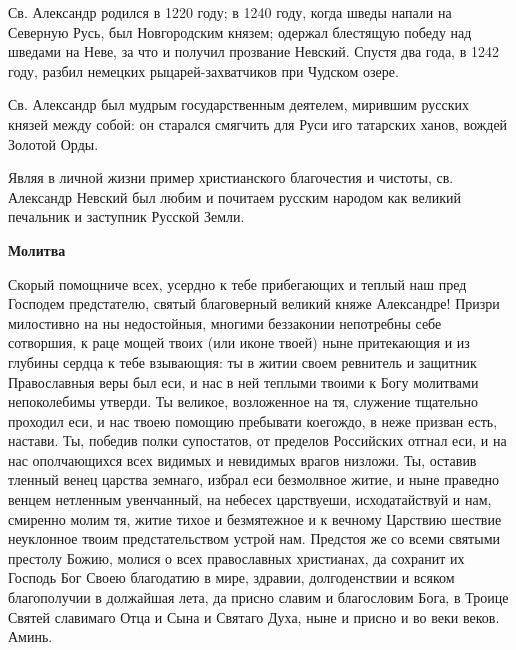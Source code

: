 \bigskip\bigskip\mychapterending

 

Св. Александр родился в 1220 году; в 1240 году, когда шведы напали на Северную Русь, был Новгородским князем; одержал блестящую победу над шведами на Неве, за что и получил прозвание Невский. Спустя два года, в 1242 году, разбил немецких рыцарей-захватчиков при Чудском озере. 

Св. Александр был мудрым государственным деятелем, мирившим русских князей между собой: он старался смягчить для Руси иго татарских ханов, вождей Золотой Орды. 

Являя в личной жизни пример христианского благочестия и чистоты, св. Александр Невский был любим и почитаем русским народом как великий печальник и заступник Русской Земли.


\medskip
\bfseries Молитва\normalfont{}

Скорый помощниче всех, усердно к тебе прибегающих и теплый наш пред Господем предстателю, святый благоверный великий княже Александре! Призри милостивно на ны недостойныя, многими беззаконии непотребны себе сотворшия, к раце мощей твоих (или иконе твоей) ныне притекающия и из глубины сердца к тебе взывающия: ты в житии своем ревнитель и защитник Православныя веры был еси, и нас в ней теплыми твоими к Богу молитвами непоколебимы утверди. Ты великое, возложенное на тя, служение тщательно проходил еси, и нас твоею помощию пребывати коегождо, в неже призван есть, настави. Ты, победив полки супостатов, от пределов Российских отгнал еси, и на нас ополчающихся всех видимых и невидимых врагов низложи. Ты, оставив тленный венец царства земнаго, избрал еси безмолвное житие, и ныне праведно венцем нетленным увенчанный, на небесех царствуеши, исходатайствуй и нам, смиренно молим тя, житие тихое и безмятежное и к вечному Царствию шествие неуклонное твоим предстательством устрой нам. Предстоя же со всеми святыми престолу Божию, молися о всех православных христианах, да сохранит их Господь Бог Своею благодатию в мире, здравии, долгоденствии и всяком благополучии в должайшая лета, да присно славим и благословим Бога, в Троице Святей славимаго Отца и Сына и Святаго Духа, ныне и присно и во веки веков. Аминь.

\bigskip\bigskip\mychapterending

 


